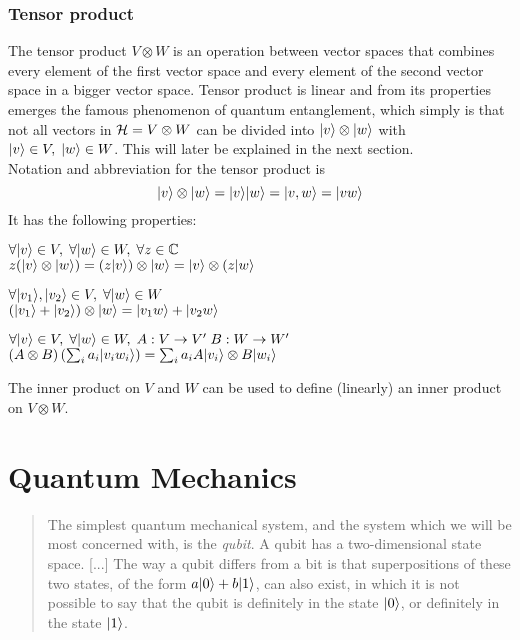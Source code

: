	\subsubsection*{Tensor product}
	The tensor product $V\otimes W$ is an operation between vector spaces that combines every element of the first vector space and every element of the second vector space in a bigger vector space. Tensor product is linear and from its properties emerges the famous phenomenon of quantum entanglement, which simply is that not all vectors in $\mathcal{H} = V\otimes W$ can be divided into $|v \rangle\otimes|w \rangle$ with $|v \rangle\in V,\; |w \rangle\in W$. This will later be explained in the next section.\\
	Notation and abbreviation for the tensor product is 
	$$ |v \rangle\otimes|w \rangle = |v \rangle|w \rangle = |v,w \rangle = |vw \rangle$$
	It has the following properties:
	\begin{description}
		\item $\forall|v \rangle\in V ,\; \forall|w \rangle\in W, \; \forall z\in \mathbb{C}$	\\
					$ z(|v \rangle\otimes|w \rangle) = (z|v \rangle)\otimes|w \rangle = |v \rangle\otimes(z|w \rangle $
		\item $\forall|v_1 \rangle,|v_2 \rangle\in V ,\; \forall|w \rangle\in W$	\\
					$ (|v_1 \rangle + |v_2 \rangle)\otimes|w \rangle = |v_1w \rangle + |v_2w \rangle $
		\item $\forall|v \rangle\in V ,\; \forall|w \rangle\in W, \; A:V\rightarrow V' \; B:W\rightarrow W'$	\\
					$ (A\otimes B) \left(\sum_i a_i |v_i w_i \rangle \right) = \sum_i a_i A|v_i \rangle\otimes B|w_i \rangle $
	\end{description}
	The inner product on $V$ and $W$ can be used to define (linearly) an inner product on $V\otimes W$.	
	
\section{Quantum Mechanics}
	
	\begin{quotation}
		The simplest quantum mechanical system, and the system which we will be most concerned with, is the \emph{qubit}. A qubit has a two-dimensional state space. [...] 
		The way a qubit differs from a bit is that superpositions of these two states, of the form $a|0 \rangle + b|1 \rangle$, can also exist, in which it is not possible to say that the qubit is definitely in the state $|0 \rangle$, or definitely in the state $|1 \rangle$.
		\cite{NC10}
	\end{quotation}
	
